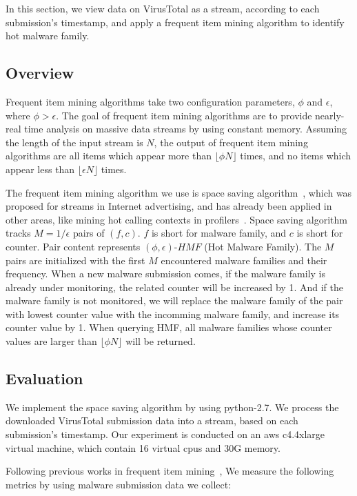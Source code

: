In this section, we view data on VirusTotal as a stream, according to each submission's timestamp, 
and apply a frequent item mining algorithm to identify hot malware family. 

\subsection{Overview}

Frequent item mining algorithms take two configuration parameters, $\phi$ and $\epsilon$, where $\phi > \epsilon$. 
The goal of frequent item mining algorithms are to provide nearly-real time analysis on massive data streams by using constant memory. 
Assuming the length of the input stream is $N$, the output of frequent item mining algorithms 
are all items which appear more than $\lfloor \phi N \rfloor$ times, 
and no items which appear less than  $\lfloor \epsilon N \rfloor$ times. 

The frequent item mining algorithm we use is space saving algorithm~\cite{space-saving}, 
which was proposed for streams in Internet advertising, and has already been applied in other areas, 
like mining hot calling contexts in profilers~\cite{hot-calling-context}.
Space saving algorithm tracks $M=1/\epsilon$ pairs of $(f, c)$. 
$f$ is short for malware family, and $c$ is short for counter.  
Pair content represents $(\phi, \epsilon)\mbox{-}HMF$ (Hot Malware Family). 
The $M$ pairs are initialized with the first $M$ encountered malware families and their frequency. 
When a new malware submission comes, 
if the malware family is already under monitoring, 
the related counter will be increased by 1. 
And if the malware family is not monitored, 
we will replace the malware family of the pair with lowest counter value with the incomming malware family, 
and increase its counter value by 1. 
When querying HMF, 
all malware families whose counter values are larger than $\lfloor \phi N \rfloor$ will be returned. 

\subsection{Evaluation}


We implement the space saving algorithm by using python-2.7.
We process the downloaded VirusTotal submission data into a stream, 
based on each submission’s timestamp. 
Our experiment is conducted on an aws c4.4xlarge virtual machine, which contain 16 virtual cpus and 30G memory. 

Following previous works in frequent item mining~\cite{hot-calling-context}, 
We measure the following metrics by using malware submission data we collect:

